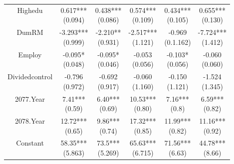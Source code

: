 \begin{table}[ht]
\begin{tabular}{|cccccc|}
Highedu & \makecell{0.617*** \\ (0.094)} & \makecell{0.438*** \\ (0.086)} & \makecell{0.574*** \\ (0.109)} & \makecell{0.434*** \\ (0.105)} & \makecell{0.655*** \\ (0.130)}\\
DumRM & \makecell{-3.293*** \\ (0.999)} & \makecell{-2.210**\\ (0.931)} & \makecell{-2.517***\\ (1.121)} & \makecell{-0.969 \\ (0.1.162)} & \makecell{-7.724*** \\ (1.412)}\\
Employ & \makecell{-0.095* \\ (0.048)} & \makecell{-0.095*\\ (0.046)} & \makecell{-0.053\\ (0.056)} & \makecell{-0.103* \\ (0.056)} & \makecell{-0.060 \\ (0.060)}\\
Dividedcontrol & \makecell{-0.796\\ (0.972)} & \makecell{-0.692\\ (0.917)} & \makecell{-0.060\\ (1.160)} & \makecell{-0.150\\ (1.121)} & \makecell{-1.524 \\ (1.345)}\\
2077.Year& \makecell{7.41***\\ (0.59)} & \makecell{6.40***\\ (0.69)} & \makecell{10.53***\\ (0.80)} & \makecell{7.16***\\ (0.8)} &\makecell{6.59*** \\ (0.82)} \\
2078.Year & \makecell{12.72*** \\ (0.65)} & \makecell{9.86***\\ (0.74)} & \makecell{17.32***\\ (0.85)} & \makecell{11.99***\\ (0.82)} &\makecell{11.16*** \\ (0.92)} \\
Constant & \makecell{58.35*** \\ (5.863)} & \makecell{73.5*** \\ (5.269)} & \makecell{65.63*** \\ (6.715)} & \makecell{71.56*** \\ (6.63)} & \makecell{44.78*** \\ (8.66)}\\

\end{tabular}
\end{table}
